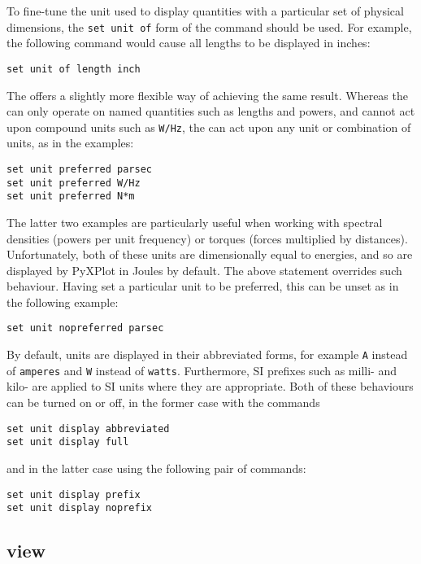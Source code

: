 To fine-tune the unit used to display quantities with a particular set of
physical dimensions, the {\tt set unit of} form of the command should be used.
For example, the following command would cause all lengths to be displayed in
inches:

\begin{verbatim}
set unit of length inch
\end{verbatim}

The  offers a slightly more flexible way of
achieving the same result. Whereas the  can only operate
on named quantities such as lengths and powers, and cannot act upon compound
units such as {\tt W/Hz}, the  can act upon any
unit or combination of units, as in the examples:
\begin{verbatim}
set unit preferred parsec
set unit preferred W/Hz
set unit preferred N*m
\end{verbatim}
The latter two examples are particularly useful when working with spectral
densities (powers per unit frequency) or torques (forces multiplied by
distances). Unfortunately, both of these units are dimensionally equal to
energies, and so are displayed by PyXPlot in Joules by default. The above
statement overrides such behaviour. Having set a particular unit to be
preferred, this can be unset as in the following example:
\begin{verbatim}
set unit nopreferred parsec
\end{verbatim}

By default, units are displayed in their abbreviated forms, for example {\tt A}
instead of {\tt amperes} and {\tt W} instead of {\tt watts}. Furthermore, SI
prefixes such as milli- and kilo- are applied to SI units where they are
appropriate. Both of these behaviours can be turned on or off, in the former
case with the commands

\begin{verbatim}
set unit display abbreviated
set unit display full
\end{verbatim}

\noindent and in the latter case using the following pair of commands:

\begin{verbatim}
set unit display prefix
set unit display noprefix
\end{verbatim}


\subsection{view}

